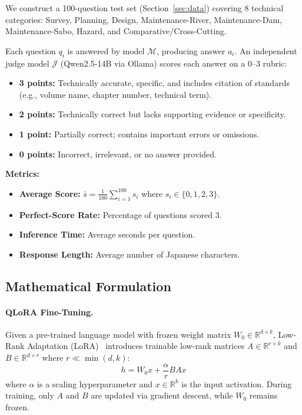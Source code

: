 \documentclass[twocolumn]{article}
\begin{document}
We construct a 100-question test set (Section~\ref{sec:data}) covering 8 technical
categories: Survey, Planning, Design, Maintenance-River, Maintenance-Dam, Maintenance-Sabo,
Hazard, and Comparative/Cross-Cutting.

Each question $q_i$ is answered by model $\mathcal{M}$, producing answer $a_i$.
An independent judge model $\mathcal{J}$ (Qwen2.5-14B via Ollama) scores each answer
on a 0--3 rubric:

\begin{itemize}
  \item \textbf{3 points:} Technically accurate, specific, and includes citation of standards
        (e.g., volume name, chapter number, technical term).
  \item \textbf{2 points:} Technically correct but lacks supporting evidence or specificity.
  \item \textbf{1 point:} Partially correct; contains important errors or omissions.
  \item \textbf{0 points:} Incorrect, irrelevant, or no answer provided.
\end{itemize}

\textbf{Metrics:}
\begin{itemize}
  \item \textbf{Average Score:} $\bar{s} = \frac{1}{100}\sum_{i=1}^{100} s_i$ where $s_i \in \{0,1,2,3\}$.
  \item \textbf{Perfect-Score Rate:} Percentage of questions scored 3.
  \item \textbf{Inference Time:} Average seconds per question.
  \item \textbf{Response Length:} Average number of Japanese characters.
\end{itemize}

\subsection{Mathematical Formulation}

\paragraph{QLoRA Fine-Tuning.}
Given a pre-trained language model with frozen weight matrix $W_0 \in \mathbb{R}^{d \times k}$,
Low-Rank Adaptation (LoRA)~\cite{hu2022lora} introduces trainable low-rank matrices 
$A \in \mathbb{R}^{r \times k}$ and $B \in \mathbb{R}^{d \times r}$ where $r \ll \min(d,k)$:
\begin{equation}
h = W_0 x + \frac{\alpha}{r} B A x
\label{eq:lora}
\end{equation}
where $\alpha$ is a scaling hyperparameter and $x \in \mathbb{R}^k$ is the input activation.
During training, only $A$ and $B$ are updated via gradient descent, while $W_0$ remains frozen.
\end{document}
